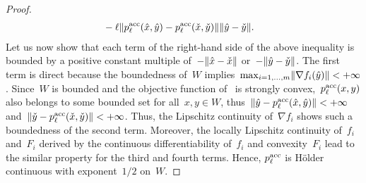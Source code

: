 \documentclass[../main]{subfiles}
\begin{document}
\begin{proof}
\begin{align}
              &- \ell \lVert p^{\mathrm{acc}}_\ell(\hat{x}, \hat{y}) - p^{\mathrm{acc}}_\ell(\check{x}, \check{y})\rVert \lVert\hat{y} - \check{y}\rVert
    .\end{align}
    Let us now show that each term of the right-hand side of the above inequality is bounded by a positive constant multiple of~$- \lVert\hat{x} - \check{x}\rVert$ or~$- \lVert\hat{y} - \check{y}\rVert$.
    The first term is direct because the boundedness of~$W$ implies~$\max_{i = 1, \dots, m} \lVert\nabla f_i(\hat{y})\rVert < + \infty$.
    Since~$W$ is bounded and the objective function of~ is strongly convex,~$p^{\mathrm{acc}}_\ell(x, y)$ also belongs to some bounded set for all~$x, y \in W$, thus~$\lVert\hat{y} - p^{\mathrm{acc}}_\ell(\hat{x}, \hat{y})\rVert < + \infty$ and~$\lVert\check{y} - p^{\mathrm{acc}}_\ell(\check{x}, \check{y})\rVert < + \infty$.
    Thus, the Lipschitz continuity of~$\nabla f_i$ shows such a boundedness of the second term.
    Moreover, the locally Lipschitz continuity of~$f_i$ and~$F_i$ derived by the continuous differentiability of~$f_i$ and convexity~$F_i$ lead to the similar property for the third and fourth terms.
    Hence, $p^{\mathrm{acc}}_\ell$ is H\"{o}lder continuous with exponent~$1 / 2$ on~$W$.


\end{proof}
\end{document}
